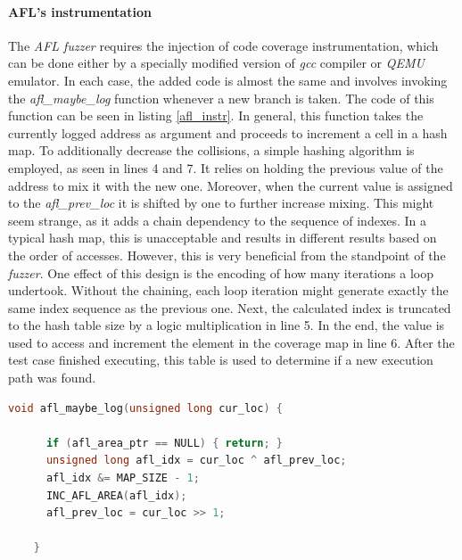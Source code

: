 \paragraph{AFL's instrumentation}
The \textit{AFL fuzzer} requires the injection of code coverage instrumentation, which can be done either by a specially modified version of \textit{gcc} compiler or \textit{QEMU} emulator. In each case, the added code is almost the same and involves invoking the \textit{afl\_maybe\_log} function whenever a new branch is taken. The code of this function can be seen in listing \ref{afl_instr}. In general, this function takes the currently logged address as argument and proceeds to increment a cell in a hash map. To additionally decrease the collisions, a simple hashing algorithm is employed, as seen in lines 4 and 7. It relies on holding the previous value of the address to mix it with the new one. Moreover, when the current value is assigned to the \textit{afl\_prev\_loc} it is shifted by one to further increase mixing. This might seem strange, as it adds a chain dependency to the sequence of indexes. In a typical hash map, this is unacceptable and results in different results based on the order of accesses. However, this is very beneficial from the standpoint of the \textit{fuzzer}. One effect of this design is the encoding of how many iterations a loop undertook. Without the chaining, each loop iteration might generate exactly the same index sequence as the previous one. Next, the calculated index is truncated to the hash table size by a logic multiplication in line 5. In the end, the value is used to access and increment the element in the coverage map in line 6. After the test case finished executing, this table is used to determine if a new execution path was found.

\begin{minipage}\linewidth
    \begin{lstlisting}[language=C,caption={Instrumentation code from AFLPlusPlus fuzzer from \cite{aflpprepo}.},captionpos=b,label={afl_instr}]
    void afl_maybe_log(unsigned long cur_loc) {
    
      if (afl_area_ptr == NULL) { return; }
      unsigned long afl_idx = cur_loc ^ afl_prev_loc;
      afl_idx &= MAP_SIZE - 1;
      INC_AFL_AREA(afl_idx);
      afl_prev_loc = cur_loc >> 1;
    
    }
    \end{lstlisting}
\end{minipage}

